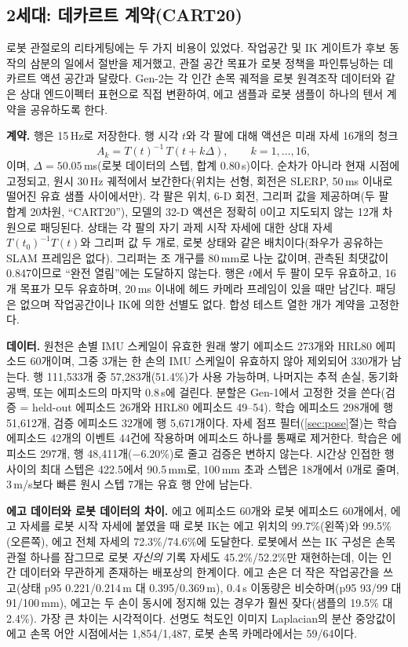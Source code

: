 \documentclass[conference,10pt]{IEEEtran}
\newcommand{\mm}{\,mm\xspace}
\begin{document}
\subsection{2세대: 데카르트 계약(CART20)}
로봇 관절로의 리타게팅에는 두 가지 비용이 있었다. 작업공간 및 IK 게이트가 후보 동작의 삼분의 일에서 절반을 제거했고, 관절 공간 목표가
로봇 정책을 파인튜닝하는 데카르트 액션 공간과 달랐다. Gen-2는 각 인간 손목 궤적을 로봇 원격조작 데이터와 같은 상대 엔드이펙터
표현으로 직접 변환하여, 에고 샘플과 로봇 샘플이 하나의 텐서 계약을 공유하도록 한다.

\textbf{계약.} 행은 15\,Hz로 저장한다. 행 시각 $t$와 각 팔에 대해 액션은 미래 자세 16개의 청크
\begin{equation}
A_k = T(t)^{-1}\,T(t+k\Delta),\qquad k=1,\dots,16,
\end{equation}
이며, $\Delta = 50.05$\,ms(로봇 데이터의 스텝, 합계 0.80\,s)이다. 순차가 아니라 현재 시점에 고정되고, 원시 30\,Hz 궤적에서
보간한다(위치는 선형, 회전은 SLERP, 50\,ms 이내로 떨어진 유효 샘플 사이에서만). 각 팔은 위치, 6-D 회전, 그리퍼 값을 제공하며(두 팔
합계 20차원, ``CART20''), 모델의 32-D 액션은 정확히 0이고 지도되지 않는 12개 차원으로 패딩된다. 상태는 각 팔의 자기 과제 시작 자세에
대한 상대 자세 $T(t_0)^{-1}T(t)$와 그리퍼 값 두 개로, 로봇 상태와 같은 배치이다(좌우가 공유하는 SLAM 프레임은 없다). 그리퍼는 조
개구를 80\mm{}로 나눈 값이며, 관측된 최댓값이 0.847이므로 ``완전 열림''에는 도달하지 않는다. 행은 $t$에서 두 팔이 모두 유효하고, 16개
목표가 모두 유효하며, 20\,ms 이내에 헤드 카메라 프레임이 있을 때만 남긴다. 패딩은 없으며 작업공간이나 IK에 의한 선별도 없다. 합성
테스트 열한 개가 계약을 고정한다.

\textbf{데이터.} 원천은 손별 IMU 스케일이 유효한 원래 쌓기 에피소드 273개와 HRL80 에피소드 60개이며, 그중 3개는 한 손의 IMU 스케일이
유효하지 않아 제외되어 330개가 남는다. 행 111{,}533개 중 57{,}283개(51.4\%)가 사용 가능하며, 나머지는 추적 손실, 동기화 공백, 또는
에피소드의 마지막 0.8\,s에 걸린다. 분할은 Gen-1에서 고정한 것을 쓴다(검증 = held-out 에피소드 26개와 HRL80 에피소드 49--54). 학습
에피소드 298개에 행 51{,}612개, 검증 에피소드 32개에 행 5{,}671개이다. 자세 점프 필터(\ref{sec:pose}절)는 학습 에피소드 42개의 이벤트
44건에 작용하며 에피소드 하나를 통째로 제거한다. 학습은 에피소드 297개, 행 48{,}411개($-6.20$\%)로 줄고 검증은 변하지 않는다. 시간상
인접한 행 사이의 최대 스텝은 422.5에서 90.5\mm{}로, 100\mm{} 초과 스텝은 18개에서 0개로 줄며, 3\,m/s보다 빠른 원시 스텝 7개는 유효 행
안에 남는다.

\textbf{에고 데이터와 로봇 데이터의 차이.} 에고 에피소드 60개와 로봇 에피소드 60개에서, 에고 자세를 로봇 시작 자세에 붙였을 때 로봇
IK는 에고 위치의 99.7\%(왼쪽)와 99.5\%(오른쪽), 에고 전체 자세의 72.3\%/74.6\%에 도달한다. 로봇에서 쓰는 IK 구성은 손목 관절 하나를
잠그므로 로봇 \emph{자신의} 기록 자세도 45.2\%/52.2\%만 재현하는데, 이는 인간 데이터와 무관하게 존재하는 배포상의 한계이다. 에고 손은
더 작은 작업공간을 쓰고(상태 p95 0.221/0.214\,m 대 0.395/0.369\,m), 0.4\,s 이동량은 비슷하며(p95 93/99 대 91/100\mm), 에고는 두 손이
동시에 정지해 있는 경우가 훨씬 잦다(샘플의 19.5\% 대 2.4\%). 가장 큰 차이는 시각적이다. 선명도 척도인 이미지 Laplacian의 분산 중앙값이
에고 손목 어안 시점에서는 1{,}854/1{,}487, 로봇 손목 카메라에서는 59/64이다.
\end{document}
